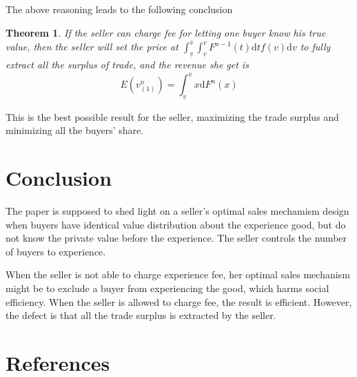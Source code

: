 \documentclass[review]{elsarticle}
\newtheorem{thm}{Theorem}
\begin{document}
The above reasoning leads to the following conclusion

\begin{thm}

 If the seller can charge fee for letting one buyer know his true value, then the seller will set the price at
 $ \int_{\underline{v}}^{\overline{v}}\int_{\underline{v}}^v F^{n-1}(t)\mathrm{d}tf(v)\mathrm{d}v$ to  fully extract all the surplus of trade, and the revenue she get is 
 \begin{equation}
  E(v_{(1)}^n)=\int_{\underline{v}}^{\overline{v}} x\mathrm{d}F^n(x) 
 \end{equation}
\end{thm}
 This is the best possible result for the seller, maximizing the trade surplus and minimizing all the buyers' share.






\section{Conclusion}

The paper is supposed to shed light on a seller's optimal
sales mechamism design when buyers have identical  value distribution about the
experience good, but do not know the private value before the experience. The seller controls the number of buyers to experience.

When the seller is not able to charge experience fee, her optimal sales mechanism might be to exclude a buyer from experiencing the good, which harms social
 efficiency. When the seller is allowed to charge fee, the result is efficient. However, the defect is that
 all the trade surplus is extracted  by the seller.
 

\section*{References}


\end{document}
